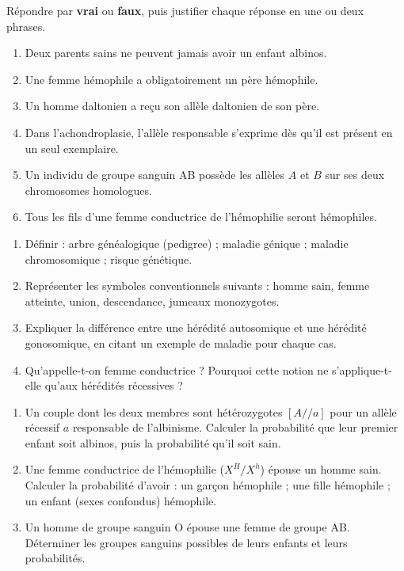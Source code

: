 \documentclass[11pt]{article}
\newcommand{\cle}[1]{{\popxbold\color{popdark}#1}}
\begin{document}
\begin{exercice}
Répondre par \textbf{vrai} ou \textbf{faux}, puis justifier chaque réponse en une ou deux phrases.
\begin{enumerate}
\item Deux parents sains ne peuvent jamais avoir un enfant albinos.
\item Une femme hémophile a obligatoirement un père hémophile.
\item Un homme daltonien a reçu son allèle daltonien de son père.
\item Dans l'achondroplasie, l'allèle responsable s'exprime dès qu'il est présent en un seul exemplaire.
\item Un individu de groupe sanguin AB possède les allèles $A$ et $B$ sur ses deux chromosomes homologues.
\item Tous les fils d'une femme conductrice de l'hémophilie seront hémophiles.
\end{enumerate}
\end{exercice}

\begin{exercice}
\begin{enumerate}
\item Définir : arbre généalogique (pedigree) ; maladie génique ; maladie chromosomique ; risque génétique.
\item Représenter les symboles conventionnels suivants : homme sain, femme atteinte, union, descendance, jumeaux monozygotes.
\item Expliquer la différence entre une hérédité autosomique et une hérédité gonosomique, en citant un exemple de maladie pour chaque cas.
\item Qu'appelle-t-on femme \cle{conductrice} ? Pourquoi cette notion ne s'applique-t-elle qu'aux hérédités récessives ?
\end{enumerate}
\end{exercice}

\begin{exercice}
\begin{enumerate}
\item Un couple dont les deux membres sont hétérozygotes $[A//a]$ pour un allèle récessif $a$ responsable de l'albinisme. Calculer la probabilité que leur premier enfant soit albinos, puis la probabilité qu'il soit sain.
\item Une femme conductrice de l'hémophilie ($X^{H}/X^{h}$) épouse un homme sain. Calculer la probabilité d'avoir : un garçon hémophile ; une fille hémophile ; un enfant (sexes confondus) hémophile.
\item Un homme de groupe sanguin O épouse une femme de groupe AB. Déterminer les groupes sanguins possibles de leurs enfants et leurs probabilités.
\end{enumerate}
\end{exercice}
\end{document}

